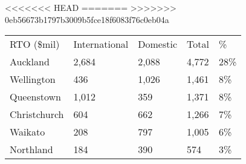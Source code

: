 <<<<<<< HEAD
=======
>>>>>>> 0eb56673b1797b3009b5fce18f6083f76c0eb04a
\begin{tabular}[t]{p{2.3cm}p{1.2cm}p{1cm}p{0.9cm}p{1.2cm}}
 RTO (\$mil) & International & Domestic & Total & \% \\ 
 Auckland & 2,684 & 2,088 & 4,772 & 28\% \\ 
  Wellington &   436 & 1,026 & 1,461 & 8\% \\ 
  Queenstown & 1,012 &   359 & 1,371 & 8\% \\ 
  Christchurch &   604 &   662 & 1,266 & 7\% \\ 
  Waikato &   208 &   797 & 1,005 & 6\% \\ 
  Northland &   184 &   390 &   574 & 3\% \\ 
  \end{tabular}
